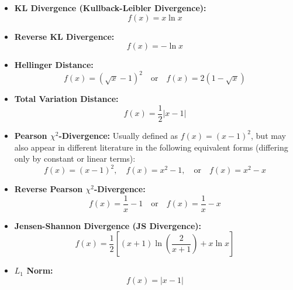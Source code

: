 \documentclass{article}
\theoremstyle{plain}
\theoremstyle{definition}
\theoremstyle{remark}
\begin{document}
\begin{itemize}
    \item \textbf{KL Divergence (Kullback-Leibler Divergence):}
    \begin{equation}
        f(x) = x \ln x
    \end{equation}

    \item \textbf{Reverse KL Divergence:}
    \begin{equation}
        f(x) = -\ln x
    \end{equation}

    \item \textbf{Hellinger Distance:}
    \begin{equation}
        f(x) = (\sqrt{x} - 1)^2 \quad \text{or} \quad f(x) = 2(1 - \sqrt{x})
    \end{equation}

    \item \textbf{Total Variation Distance:}
    \begin{equation}
        f(x) = \frac{1}{2}|x - 1|
    \end{equation}

    \item \textbf{Pearson $\chi^2$-Divergence:}
    Usually defined as $f(x) = (x-1)^2$, but may also appear in different literature in the following equivalent forms (differing only by constant or linear terms):
    \begin{equation}
        f(x) = (x - 1)^2, \quad f(x) = x^2 - 1, \quad \text{or} \quad f(x) = x^2 - x
    \end{equation}

    \item \textbf{Reverse Pearson $\chi^2$-Divergence:}
    \begin{equation}
        f(x) = \frac{1}{x} - 1 \quad \text{or} \quad f(x) = \frac{1}{x} - x
    \end{equation}

    \item \textbf{Jensen-Shannon Divergence (JS Divergence):}
    \begin{equation}
        f(x) = \frac{1}{2}\left[ (x+1) \ln\left(\frac{2}{x+1}\right) + x \ln x \right]
    \end{equation}

    \item \textbf{$L_1$ Norm:}
    \begin{equation}
        f(x) = |x - 1|
    \end{equation}
\end{itemize}
\end{document}
